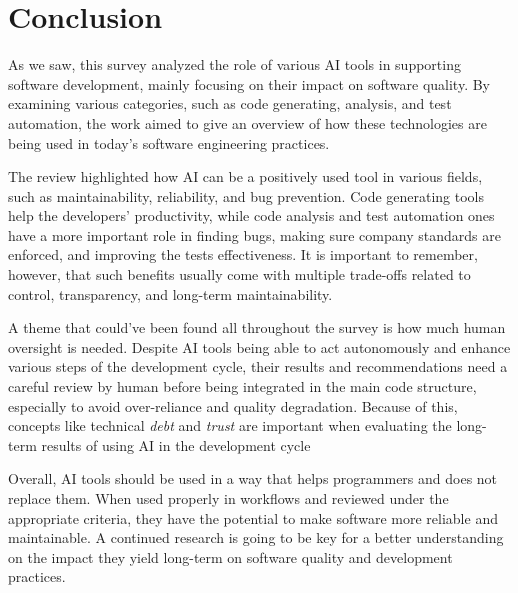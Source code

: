 \chapter*{Conclusion}

As we saw, this survey analyzed the role of various AI tools in supporting software development, mainly focusing on their impact on software quality. By examining various categories, such as code generating, analysis, and test automation, the work aimed to give an overview of how these technologies are being used in today's software engineering practices.

The review highlighted how AI can be a positively used tool in various fields, such as maintainability, reliability, and bug prevention. Code generating tools help the developers' productivity, while code analysis and test automation ones have a more important role in finding bugs, making sure company standards are enforced, and improving the tests effectiveness. It is important to remember, however, that such benefits usually come with multiple trade-offs related to control, transparency, and long-term maintainability.

A theme that could've been found all throughout the survey is how much human oversight is needed. Despite AI tools being able to act autonomously and enhance various steps of the development cycle, their results and recommendations need a careful review by human before being integrated in the main code structure, especially to avoid over-reliance and quality degradation. Because of this, concepts like technical \textit{debt} and \textit{trust} are important  when evaluating the long-term results of using AI in the development cycle

Overall, AI tools should be used in a way that helps programmers and does not replace them. When used properly in workflows and reviewed under the appropriate criteria, they have the potential to make software more reliable and maintainable. A continued research is going to be key for a better understanding on the impact they yield long-term on software quality and development practices.